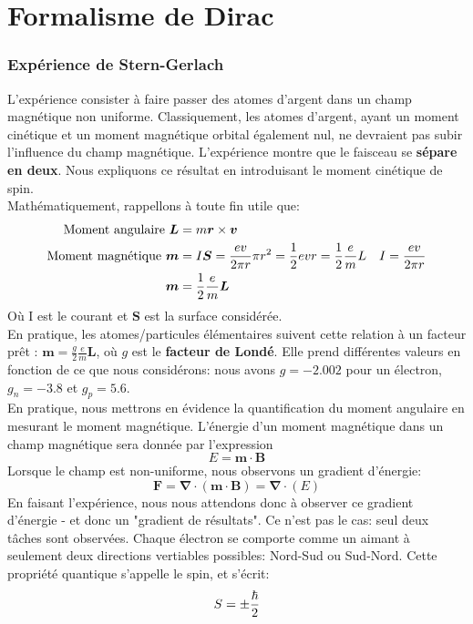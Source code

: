 \documentclass[../notesdecours.tex]{subfiles}
\begin{document}
\part{Formalisme de Dirac} \label{Formalisme de Dirac}
\section{Expérience de Stern-Gerlach}
L'expérience consister à faire passer des atomes d'argent dans un champ magnétique non uniforme. Classiquement, les atomes d'argent, ayant un moment cinétique et un moment magnétique orbital également nul, ne devraient pas subir l'influence du champ magnétique. L'expérience montre que le faisceau se \textbf{sépare en deux}. Nous expliquons ce résultat en introduisant le moment cinétique de spin.\\

Mathématiquement, rappellons à toute fin utile que:
\begin{align}
\text{Moment angulaire } \bm{L} &= m\bm{r}\times\bm{v} \label{Moment angulaire}\\
\text{Moment magnétique } \bm{m} &= I\bm{S}	= \frac{ev}{2\pi r} \pi r^2 = \frac{1}{2}evr = \frac{1}{2}\frac{e}{m}L	&I = \frac{ev}{2\pi r}\\
\bm{m} &= \frac{1}{2}\frac{e}{m}\bm{L} \label{moment magnétique}
\end{align}
Où I est le courant et $\bm{S}$ est la surface considérée.\\

En pratique, les atomes/particules élémentaires suivent cette relation à un facteur prêt : $\bm{m} = \frac{g}{2}\frac{e}{m}\bm{L}$, où $g$ est le \textbf{facteur de Londé}. Elle prend différentes valeurs en fonction de ce que nous considérons: nous avons $g = -2.002$ pour un électron, $g_n = -3.8$ et $g_p = 5.6$.\\

En pratique, nous mettrons en évidence la quantification du moment angulaire en mesurant le moment magnétique. L'énergie d'un moment magnétique dans un champ magnétique sera donnée par l'expression
\begin{equation}
E = \bm{m}\cdot\bm{B}
\end{equation}
Lorsque le champ est non-uniforme, nous observons un gradient d'énergie:
\begin{equation}
\bm{F} = \bm{\nabla}\cdot(\bm{m}\cdot\bm{B}) = \bm{\nabla}\cdot(E)
\end{equation}
En faisant l'expérience, nous nous attendons donc à observer ce gradient d'énergie - et donc un "gradient de résultats". Ce n'est pas le cas: seul deux tâches sont observées. Chaque électron se comporte comme un aimant à seulement deux directions vertiables possibles: Nord-Sud ou Sud-Nord. Cette propriété quantique s'appelle le spin, et s'écrit:
\begin{equation}
S = \pm \frac{\hbar}{2}
\end{equation}
\end{document}
